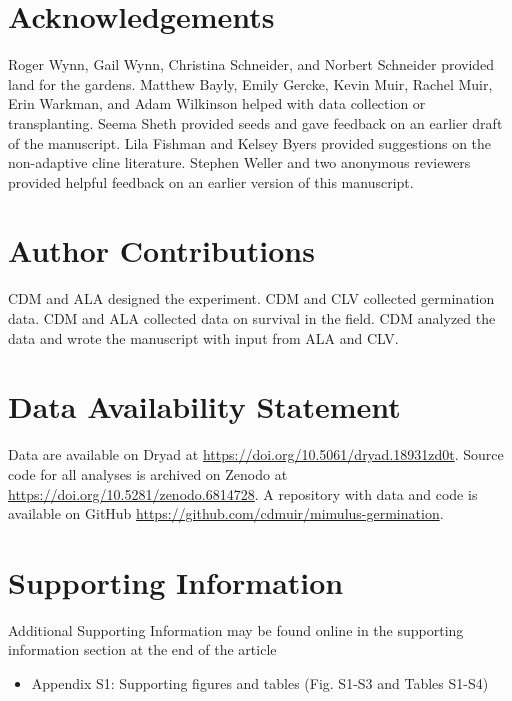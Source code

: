 \documentclass[
  12pt,
]{article}
\providecommand{\tightlist}{%
  \setlength{\itemsep}{0pt}\setlength{\parskip}{0pt}}
\begin{document}
\hypertarget{acknowledgements}{%
\section{Acknowledgements}\label{acknowledgements}}

Roger Wynn, Gail Wynn, Christina Schneider, and Norbert Schneider provided land for the gardens. Matthew Bayly, Emily Gercke, Kevin Muir, Rachel Muir, Erin Warkman, and Adam Wilkinson helped with data collection or transplanting. Seema Sheth provided seeds and gave feedback on an earlier draft of the manuscript. Lila Fishman and Kelsey Byers provided suggestions on the non-adaptive cline literature. Stephen Weller and two anonymous reviewers provided helpful feedback on an earlier version of this manuscript.

\hypertarget{author-contributions}{%
\section{Author Contributions}\label{author-contributions}}

CDM and ALA designed the experiment. CDM and CLV collected germination data. CDM and ALA collected data on survival in the field. CDM analyzed the data and wrote the manuscript with input from ALA and CLV.

\hypertarget{data-availability-statement}{%
\section{Data Availability Statement}\label{data-availability-statement}}

Data are available on Dryad at \url{https://doi.org/10.5061/dryad.18931zd0t}. Source code for all analyses is archived on Zenodo at \url{https://doi.org/10.5281/zenodo.6814728}. A repository with data and code is available on GitHub \url{https://github.com/cdmuir/mimulus-germination}.

\hypertarget{supporting-information}{%
\section{Supporting Information}\label{supporting-information}}

Additional Supporting Information may be found online in the supporting information section at the end of the article

\begin{itemize}
\tightlist
\item
  Appendix S1: Supporting figures and tables (Fig. S1-S3 and Tables S1-S4)
\end{itemize}
\end{document}
